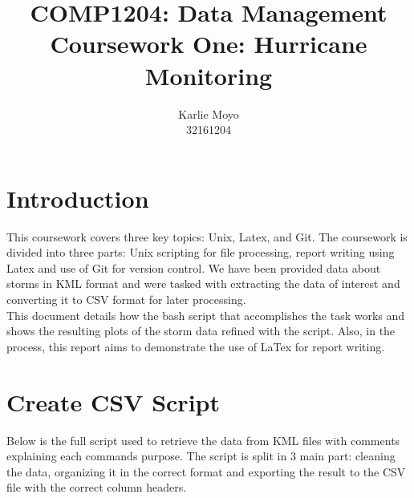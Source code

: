 \documentclass[]{article}
\begin{document}
\title{COMP1204: Data Management \\ Coursework One: Hurricane Monitoring }
\author{Karlie Moyo \\ 32161204}
\maketitle

\section{Introduction}
This coursework covers three key topics: Unix, Latex, and Git. The coursework is divided into three parts: Unix scripting for file processing, report writing using Latex and use of Git for version control. We have been provided data about storms in KML format and were tasked with extracting the data of interest and converting it to CSV format for later processing.\\ This document details how the bash script that accomplishes the task works and shows the resulting plots of the storm data refined with the script. Also, in the process, this report aims to demonstrate the use of LaTex for report writing.

\section{Create CSV Script}
Below is the full script used to retrieve the data from KML files with comments explaining each commands purpose. The script is split in 3 main part: cleaning the data, organizing it in the correct format and exporting the result to the CSV file with the correct column headers.\\
\end{document}
